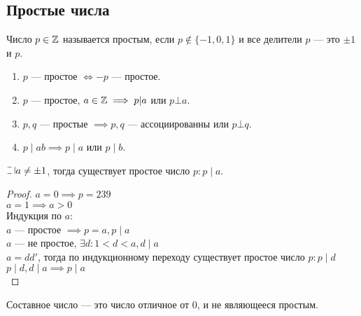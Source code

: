 \begin{normalsize}

\section{Простые числа}

\begin{defn}
    Число $p \in \mathbb{Z}$ называется простым, если $p \notin \{-1, 0, 1\}$ и все делители $p$ --- это $\pm 1$ и $p$.
\end{defn}

\begin{prop}
    \begin{enumerate}
        \item $p$ --- простое $\iff -p$ --- простое.
        \item $p$ --- простое, $a \in \mathbb{Z} \implies p | a$ или $p \bot a$.
        \item $p, q$ --- простые $\implies p, q$ --- ассоциированны или $p \bot q$.
        \item $p \mid ab \implies p \mid a$ или $p \mid b$. 
    \end{enumerate}
\end{prop}

\begin{theorem-non}
    $\letus a \neq \pm 1$, тогда существует простое число $p : p \mid a$.
\end{theorem-non}

\begin{proof}
    $a = 0 \implies p = 239$\\
    $a = 1 \implies a > 0$\\
    Индукция по $a$:\\
    $a$ --- простое $\implies p = a, p \mid a$\\
    $a$ --- не простое, $\exists d : 1 < d < a, d \mid a$\\
    $a = dd'$, тогда по индукционному переходу существует простое число $p : p \mid d$\\
    $p \mid d, d \mid a \implies p \mid a$\\
\end{proof}

\begin{defn}
    Составное число --- это число отличное от 0, и не являющееся простым.
\end{defn}

\end{normalsize}